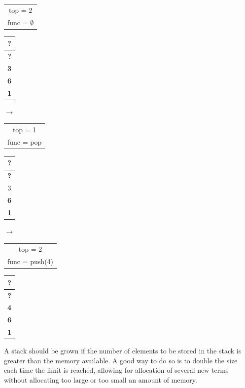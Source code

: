 \documentclass[nobib]{tufte-handout}
\begin{document}
\begin{table}
    \centering
    \begin{tabular}{c}
        top = 2            \\
        func = $\emptyset$ \\
    \end{tabular}
    \begin{tabular}{|c|}
        \hline
        \textbf{?} \\
        \hline
        \textbf{?} \\
        \hline
        \textbf{3} \\
        \hline
        \textbf{6} \\
        \hline
        \textbf{1} \\
        \hline
    \end{tabular}
    $\rightarrow$
    \begin{tabular}{c}
        top = 1    \\
        func = pop \\
    \end{tabular}
    \begin{tabular}{|c|}
        \hline
        \textbf{?} \\
        \hline
        \textbf{?} \\
        \hline
        3          \\
        \hline
        \textbf{6} \\
        \hline
        \textbf{1} \\
        \hline
    \end{tabular}
    $\rightarrow$
    \begin{tabular}{c}
        top = 2        \\
        func = push(4) \\
    \end{tabular}
    \begin{tabular}{|c|}
        \hline
        \textbf{?} \\
        \hline
        \textbf{?} \\
        \hline
        \textbf{4} \\
        \hline
        \textbf{6} \\
        \hline
        \textbf{1} \\
        \hline
    \end{tabular}
\end{table}
A stack should be grown if the number of elements to be stored in the stack is greater than the memory available. A good way to do so is to double the size each time the limit is reached, allowing for allocation of several new terms without allocating too large or too small an amount of memory.\\
\end{document}
